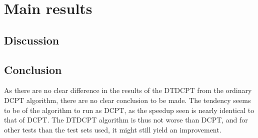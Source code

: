 \section{Main results}


\subsection{Discussion}


\subsection{Conclusion}
As there are no clear difference in the results of the DTDCPT from the ordinary
DCPT algorithm, there are no clear conclusion to be made. The tendency seems to
be of the algorithm to run as DCPT, as the speedup seen is nearly identical to
that of DCPT. The DTDCPT algorithm is thus not worse than DCPT, and for other
tests than the test sets used, it might still yield an improvement.
